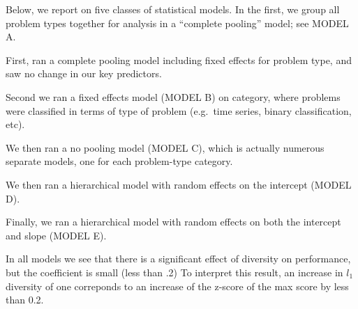 \documentclass{article}
\begin{document}
Below, we report on five classes of statistical models. In the first,
we group all problem types together for analysis in a ``complete
pooling'' model; see MODEL A.

First, ran a complete pooling model including fixed effects for problem
type, and saw no change in our key predictors.


Second we ran a fixed effects model (MODEL B) on category, where
problems were classified in terms of type of problem (e.g.\ time
series, binary classification, etc).

We then ran a no pooling model (MODEL C), which is actually numerous
separate models, one for each problem-type category.

We then ran a hierarchical model with random effects on the intercept
(MODEL D).

Finally, we ran a hierarchical model with random effects on both the
intercept and slope (MODEL E).

In all models we see that there is a significant effect of diversity
on performance, but the coefficient is small (less than .2) To
interpret this result, an increase in $l_1$ diversity of one
correponds to an increase of the z-score of the max score by less than
0.2.
\end{document}

